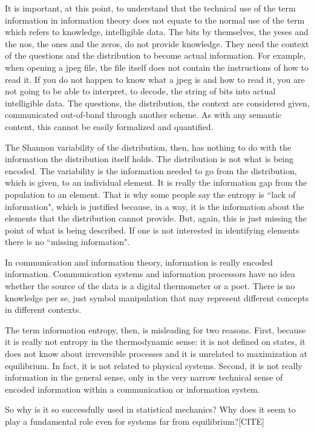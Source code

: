 \documentclass{article}
\begin{document}
It is important, at this point, to understand that the technical use of the term information in information theory does not equate to the normal use of the term which refers to knowledge, intelligible data. The bits by themselves, the yeses and the nos, the ones and the zeros, do not provide knowledge. They need the context of the questions and the distribution to become actual information. For example, when opening a jpeg file, the file itself does not contain the instructions of how to read it. If you do not happen to know what a jpeg is and how to read it, you are not going to be able to interpret, to decode, the string of bits into actual intelligible data. The questions, the distribution, the context are considered given, communicated out-of-band through another scheme. As with any semantic content, this cannot be easily formalized and quantified.

The Shannon variability of the distribution, then, has nothing to do with the information the distribution itself holds. The distribution is not what is being encoded. The variability is the information needed to go from the distribution, which is given, to an individual element. It is really the information gap from the population to an element. That is why some people say the entropy is ``lack of information", which is justified because, in a way, it is the information about the elements that the distribution cannot provide. But, again, this is just missing the point of what is being described. If one is not interested in identifying elements there is no ``missing information".

In communication and information theory, information is really encoded information. Communication systems and information processors have no idea whether the source of the data is a digital thermometer or a poet. There is no knowledge per se, just symbol manipulation that may represent different concepts in different contexts.

The term information entropy, then, is misleading for two reasons. First, because it is really not entropy in the thermodynamic sense: it is not defined on states, it does not know about irreversible processes and it is unrelated to maximization at equilibrium. In fact, it is not related to physical systems. Second, it is not really information in the general sense, only in the very narrow technical sense of encoded information within a communication or information system.

So why is it so successfully used in statistical mechanics? Why does it seem to play a fundamental role even for systems far from equilibrium?[CITE]
\end{document}

